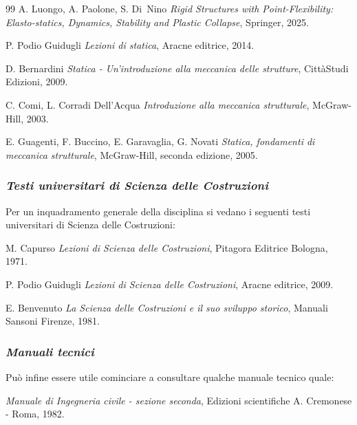 \begin{thebibliography}{99}
	A. Luongo, A. Paolone, S. Di~Nino \textit{Rigid Structures with Point-Flexibility: Elasto-statics, Dynamics, Stability and Plastic Collapse}, Springer, 2025.
	
	P. Podio Guidugli {\em Lezioni di statica}, Aracne editrice, 2014.
	
	D. Bernardini \emph{Statica - Un'introduzione alla meccanica delle strutture}, Citt\`{a}Studi Edizioni, 2009.
	
	C. Comi, L. Corradi Dell'Acqua {\em Introduzione alla meccanica
		strutturale}, McGraw-Hill, 2003.
	
	E. Guagenti, F. Buccino, E. Garavaglia, G. Novati \emph{Statica,
		fondamenti di meccanica strutturale}, McGraw-Hill, seconda edizione, 2005.
	
	
	
	\subsubsection{\emph{Testi universitari di Scienza delle Costruzioni}}
	\noindent Per un inquadramento generale della disciplina si vedano i
	seguenti testi universitari di Scienza delle Costruzioni:
	
	M. Capurso {\em Lezioni di Scienza delle Costruzioni}, Pitagora Editrice Bologna, 1971.
	
	P. Podio Guidugli {\em Lezioni di Scienza delle Costruzioni}, Aracne editrice, 2009.
	
	E. Benvenuto {\em La Scienza delle Costruzioni e il suo sviluppo
		storico}, Manuali Sansoni Firenze, 1981.
	
	
	\subsubsection{\emph{Manuali tecnici}}
	\noindent Pu\`{o} infine essere utile cominciare a consultare qualche
	manuale tecnico quale:
	
	{\em Manuale di Ingegneria civile - sezione seconda}, Edizioni scientifiche A. Cremonese - Roma, 1982.
	
	

	
	

\end{thebibliography}
